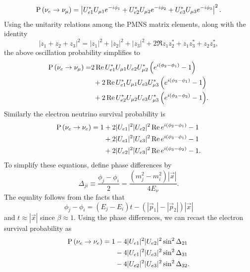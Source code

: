 \begin{equation}
  \operatorname{P}\left(\nu_e\to\nu_\mu\right)=\left|U_{e1}^*U_{\mu 1}e^{-i\phi_1}
                    +U_{e2}^*U_{\mu 2}e^{-i\phi_2}
                    +U_{e3}^*U_{\mu 3}e^{-i\phi_3}\right|^2.
\end{equation}
Using the unitarity relations among the PMNS matrix elements, along with the
identity
\begin{equation}
  |z_1+z_2+z_3|^2=|z_1|^2+|z_2|^2+|z_3|^2
                  +2\Re{z_1z_2^*+z_1z_3^*+z_2z_3^*},
\end{equation}
the above oscillation probability simplifies to
\begin{equation}
  \begin{aligned}
    \operatorname{P}\left(\nu_e\to\nu_\mu\right)=&
    2\mathop{\mathrm{Re}}{U_{e1}^*U_{\mu 1}U_{e2}U_{\mu 2}^*\left(e^{i(\phi_2-\phi_1)}-1\right)}
     \\&~+
    2\mathop{\mathrm{Re}}{U_{e1}^*U_{\mu 1}U_{e3}U_{\mu 3}^*\left(e^{i(\phi_3-\phi_1)}-1\right)}
     \\&~+
    2\mathop{\mathrm{Re}}{U_{e2}^*U_{\mu 2}U_{e3}U_{\mu 3}^*\left(e^{i(\phi_3-\phi_2)}-1\right)}
     .
  \end{aligned}
\end{equation}
Similarly the electron neutrino survival probability is
\begin{equation}
  \begin{aligned}
    \operatorname{P}\left(\nu_e\to\nu_e\right)=1&+2|U_{e1}|^2|U_{e2}|^2\mathop{\mathrm{Re}}{e^{i(\phi_2-\phi_1)}-1} \\
                        &+2|U_{e1}|^2|U_{e3}|^2\mathop{\mathrm{Re}}{e^{i(\phi_3-\phi_1)}-1} \\
                        &+2|U_{e2}|^2|U_{e3}|^2\mathop{\mathrm{Re}}{e^{i(\phi_3-\phi_2)}-1}.
  \end{aligned}
\end{equation}
To simplify these equations, define phase differences by
\begin{equation}
  \label{eq:phase}
  \Delta_{ji}\equiv\frac{\phi_j-\phi_i}{2}
                  =\frac{(m_j^2-m_i^2)|\vec{x}|}{4E_\nu}.
\end{equation}
The equality follows from the facts that
\begin{equation}
  \phi_j-\phi_i=(E_j-E_i)t-(|\vec{p}_1|-|\vec{p}_2|)|\vec{x}|
\end{equation}
and $t\approx|\vec{x}|$ since $\beta\approx1$.
Using the phase differences, we can recast the electron survival probability as
\begin{equation}
  \label{eq:esurv}
  \begin{aligned}
    \operatorname{P}\left(\nu_e\to\nu_e\right)=1&-4|U_{e1}|^2|U_{e2}|^2\sin^2\Delta_{21} \\
                        &-4|U_{e1}|^2|U_{e3}|^2\sin^2\Delta_{31} \\
                        &-4|U_{e2}|^2|U_{e3}|^2\sin^2\Delta_{32}.
  \end{aligned}
\end{equation}
